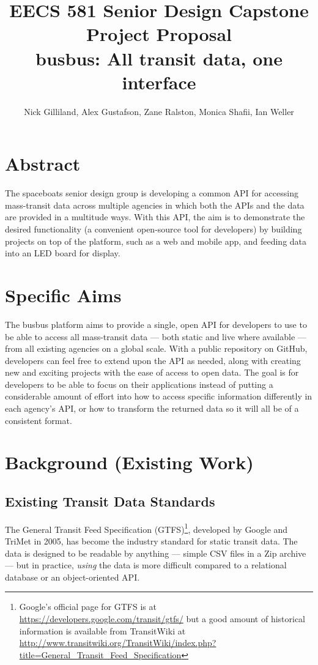 \documentclass[12pt]{article}
\title{EECS 581 Senior Design Capstone Project Proposal \\
busbus: All transit data, one interface}
\author{Nick Gilliland, Alex Gustafson, Zane Ralston, Monica Shafii, Ian Weller}
\begin{document}
\maketitle

\section{Abstract}

The spaceboats senior design group is developing a common API for accessing mass-transit data
across multiple agencies in which both the APIs and the data are provided in a multitude ways.
With this API, the aim is to demonstrate the desired functionality (a convenient open-source tool 
for developers) by building projects on top of the platform, such as a web and mobile app, and 
feeding data into an LED board for display.

\section{Specific Aims}

The busbus platform aims to provide a single, open API for developers to use to be able to access all
mass-transit data --- both static and live where available --- from all existing agencies on a global scale.
With a public repository on GitHub, developers can feel free to extend upon the API as needed,
along with creating new and exciting projects with the ease of access to open data. The goal is for
developers to be able to focus on their applications instead of putting a considerable amount of
effort into how to access specific information differently in each agency's API, or how to transform
the returned data so it will all be of a consistent format.

\section{Background (Existing Work)}
\subsection{Existing Transit Data Standards}
The General Transit Feed Specification (GTFS)\footnote{Google's official page for GTFS is at
    \url{https://developers.google.com/transit/gtfs/} but a good amount of historical information
    is available from TransitWiki at \url{http://www.transitwiki.org/TransitWiki/index.php?title=General_Transit_Feed_Specification}},
developed by Google and TriMet in 2005,
has become the industry standard for static transit data.
The data is designed to be readable by anything --- simple CSV files in a Zip archive ---
but in practice, \textit{using} the data is more difficult compared to a relational database
or an object-oriented API.
\end{document}
